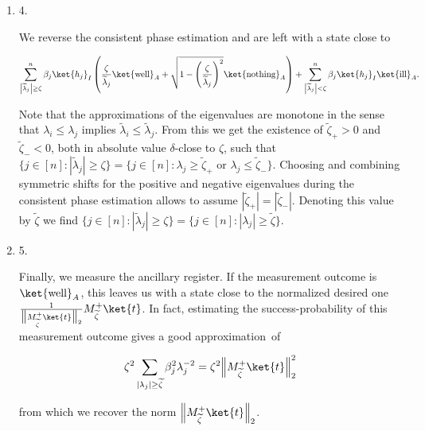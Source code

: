\begin{enumerate}
\item[] 
4. 


We reverse the consistent phase estimation and are left with a state close to\par


\[\begin{gathered}
\sum_{\left|\widetilde{\lambda}_{j}\right|\geq\zeta}^{n}\beta_{j}\ket{h_{j}}_{I}\left(\frac{\zeta}{\widetilde{\lambda}_{j}}\ket{\text{well}}_{A}+\sqrt{1-\left(\frac{\zeta}{\widetilde{\lambda}_{j}}\right)^{2}}\ket{\text{nothing}}_{A}\right)+\sum_{\left|\widetilde{\lambda}_{j}\right|<\zeta}^{n}\beta_{j}\ket{h_{j}}_{I}\ket{\text{ill}}_{A}.
\end{gathered}\]


Note that the approximations of the eigenvalues are monotone in the sense that $\lambda_{i}\leq\lambda_{j}$ implies $\widetilde{\lambda}_{i}\leq\widetilde{\lambda}_{j}$.
From this we get the existence of $\widetilde{\zeta}_{+}>0$ and $\widetilde{\zeta}_{-}<0$, both in absolute value $\delta$-close to $\zeta$, such that
$\{j\in[n]:|\widetilde{\lambda}_{j}|\geq\zeta\}=\{j\in[n]:\lambda_{j}\geq\tilde{\zeta}_{+}\text{ or }\lambda_{j}\leq\tilde{\zeta}_{-}\}$.
Choosing and combining symmetric shifts for the positive and negative eigenvalues during the consistent phase estimation allows to assume $|\widetilde{\zeta}_{+}|=|\widetilde{\zeta}_{-}|$.
Denoting this value by $\tilde{\zeta}$ we find
$\{j\in[n]:|\widetilde{\lambda}_{j}|\geq\zeta\}=\{j\in[n]:|\lambda_{j}|\geq\tilde{\zeta}\}$.\par





\item[] 
5. 


Finally, we measure the ancillary register. If the measurement outcome is $\ket{\text{well}}_{A}$, this leaves us with a state close to the normalized desired one $\frac{1}{\big{\|}M_{\widetilde{\zeta}}^{+}\ket{t}\big{\|}_{2}}M_{\widetilde{\zeta}}^{+}\ket{t}$.
In fact, estimating the success-probability of this measurement outcome gives a good approximation of\par




\[\begin{gathered}
\zeta^{2}\sum_{|\lambda_{j}|\geq\widetilde{\zeta}}\beta_{j}^{2}\lambda_{j}^{-2}=\zeta^{2}\Big{\|}M_{\widetilde{\zeta}}^{+}\ket{t}\Big{\|}_{2}^{2}
\end{gathered}\]


from which we recover the norm $\Big{\|}M_{\widetilde{\zeta}}^{+}\ket{t}\Big{\|}_{2}$.\par





\end{enumerate}




